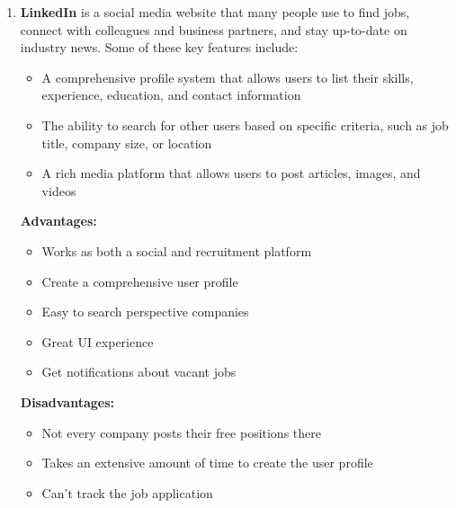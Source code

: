 \begin{enumerate}
    
    \item \textbf{LinkedIn} is a social media website that many people use to find jobs, connect with colleagues and business partners, and stay up-to-date on industry news. Some of these key features include:
    
    \begin{itemize}
        \item A comprehensive profile system that allows users to list their skills, experience, education, and contact information
        \item The ability to search for other users based on specific criteria, such as job title, company size, or location
        \item A rich media platform that allows users to post articles, images, and videos
    \end{itemize}
    
    \textbf{Advantages:}
    \begin{itemize}
        \item Works as both a social and recruitment platform
        \item Create a comprehensive user profile
        \item Easy to search perspective companies 
        \item Great UI experience
        \item Get notifications about vacant jobs
    \end{itemize}
    
    \textbf{Disadvantages:}
    \begin{itemize}
        \item Not every company posts their free positions there
        \item Takes an extensive amount of time to create the user profile
        \item Can’t track the job application
    \end{itemize}
\end{enumerate}

